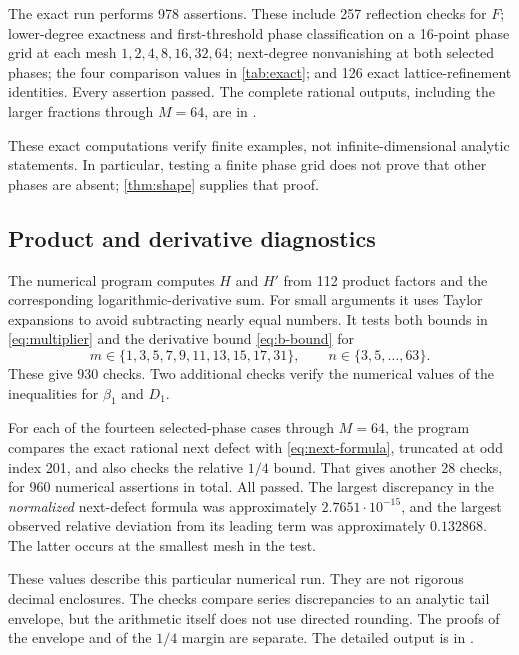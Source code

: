 \documentclass[11pt,a4paper]{article}
\numberwithin{equation}{section}
\theoremstyle{plain}
\theoremstyle{definition}
\theoremstyle{remark}
\begin{document}
The exact run performs 978 assertions. These include 257 reflection checks
for $F$; lower-degree exactness and first-threshold phase classification on
a 16-point phase grid at each mesh $1,2,4,8,16,32,64$; next-degree
nonvanishing at both selected phases; the four comparison values in
\cref{tab:exact}; and 126 exact lattice-refinement identities. Every
assertion passed. The complete rational outputs, including the larger
fractions through $M=64$, are in .

These exact computations verify finite examples, not infinite-dimensional
analytic statements. In particular, testing a finite phase grid does not
prove that other phases are absent; \cref{thm:shape} supplies that proof.

\subsection{Product and derivative diagnostics}

The numerical program computes $H$ and $H'$ from 112 product factors and
the corresponding logarithmic-derivative sum. For small arguments it uses
Taylor expansions to avoid subtracting nearly equal numbers. It tests both
bounds in \eqref{eq:multiplier} and the derivative bound
\eqref{eq:b-bound} for
\[
 m\in\{1,3,5,7,9,11,13,15,17,31\},\qquad
 n\in\{3,5,\ldots,63\}.
\]
These give 930 checks. Two additional checks verify the numerical values
of the inequalities for $\beta_1$ and $D_1$.

For each of the fourteen selected-phase cases through $M=64$, the program
compares the exact rational next defect with \eqref{eq:next-formula},
truncated at odd index 201, and also checks the relative $1/4$ bound.
That gives another 28 checks, for 960 numerical assertions in total.
All passed. The largest discrepancy in the \emph{normalized} next-defect
formula was approximately $2.7651\cdot10^{-15}$, and the largest observed
relative deviation from its leading term was approximately $0.132868$.
The latter occurs at the smallest mesh in the test.

These values describe this particular numerical run. They are not
rigorous decimal enclosures. The checks compare series discrepancies to
an analytic tail envelope, but the arithmetic itself does not use directed
rounding. The proofs of the envelope and of the $1/4$ margin are separate.
The detailed output is in .
\end{document}
